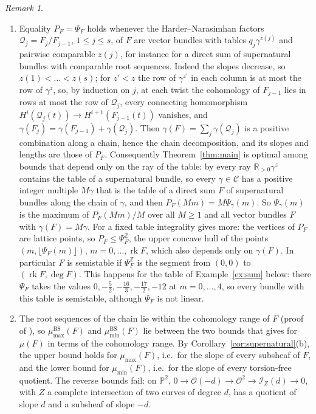 \documentclass[11pt]{amsart}
\theoremstyle{definition}
\theoremstyle{remark}
\newtheorem{remark}[theorem]{Remark}
\newcommand{\PP}{\mathbb{P}}
\newcommand{\RR}{\mathbb{R}}
\newcommand{\ZZ}{\mathbb{Z}}
\newcommand{\OO}{\mathcal{O}}
\newcommand{\cI}{\mathcal{I}}
\newcommand{\cQ}{\mathcal{Q}}
\newcommand{\CC}{\mathcal{C}}
\newcommand{\BS}{\mathrm{BS}}
\DeclareMathOperator{\rk}{rk}
\begin{document}
\begin{remark}\label{rem:main}
\begin{enumerate}[label=(\arabic*)]
\item Equality $P_F=\Psi_F$ holds whenever the Harder--Narasimhan factors $\cQ_j=F_j/F_{j-1}$, $1\le j\le s$, of $F$ are vector bundles with tables $q_j\gamma^{z(j)}$ and pairwise comparable $z(j)$, for instance for a direct sum of supernatural bundles with comparable root sequences. Indeed the slopes decrease, so $z(1)<\dots<z(s)$; for $z'<z$ the row of $\gamma^{z'}$ in each column is at most the row of $\gamma^z$, so, by induction on $j$, at each twist the cohomology of $F_{j-1}$ lies in rows at most the row of $\cQ_j$, every connecting homomorphism $H^i(\cQ_j(t))\to H^{i+1}(F_{j-1}(t))$ vanishes, and $\gamma(F_j)=\gamma(F_{j-1})+\gamma(\cQ_j)$. Then $\gamma(F)=\sum_j\gamma(\cQ_j)$ is a positive combination along a chain, hence the chain decomposition, and its slopes and lengths are those of $P_F$. Consequently Theorem~\ref{thm:main} is optimal among bounds that depend only on the ray of the table: by \cite[Thm.~6.1]{ES09} every ray $\RR_{>0}\gamma^z$ contains the table of a supernatural bundle, so every $\gamma\in\CC$ has a positive integer multiple $M\gamma$ that is the table of a direct sum $F$ of supernatural bundles along the chain of $\gamma$, and then $P_F(Mm)=M\Psi_\gamma(m)$. So $\Psi_\gamma(m)$ is the maximum of $P_F(Mm)/M$ over all $M\ge1$ and all vector bundles $F$ with $\gamma(F)=M\gamma$. For a fixed table integrality gives more: the vertices of $P_F$ are lattice points, so $P_F\le\Psi^{\ZZ}_F$, the upper concave hull of the points $(m,\lfloor\Psi_F(m)\rfloor)$, $m=0,\dots,\rk F$, which also depends only on $\gamma(F)$. In particular $F$ is semistable if $\Psi^{\ZZ}_F$ is the segment from $(0,0)$ to $(\rk F,\deg F)$. This happens for the table of Example~\ref{ex:sum} below: there $\Psi_F$ takes the values $0,-\frac52,-\frac{16}3,-\frac{17}2,-12$ at $m=0,\dots,4$, so every bundle with this table is semistable, although $\Psi_F$ is not linear.
\item The root sequences of the chain lie within the cohomology range of $F$ (proof of \cite[Cor.~0.6]{ES09}), so $\mu^\BS_{\max}(F)$ and $\mu^\BS_{\min}(F)$ lie between the two bounds that \cite[Cor.~0.6]{ES09} gives for $\mu(F)$ in terms of the cohomology range. By Corollary~\ref{cor:supernatural}(b), the upper bound holds for $\mu_{\max}(F)$, i.e.\ for the slope of every subsheaf of $F$, and the lower bound for $\mu_{\min}(F)$, i.e.\ for the slope of every torsion-free quotient. The reverse bounds fail: on $\PP^2$, $0\to\OO(-d)\to\OO^2\to\cI_Z(d)\to0$, with $Z$ a complete intersection of two curves of degree $d$, has a quotient of slope $d$ and a subsheaf of slope $-d$.

\end{enumerate}
\end{remark}
\end{document}
